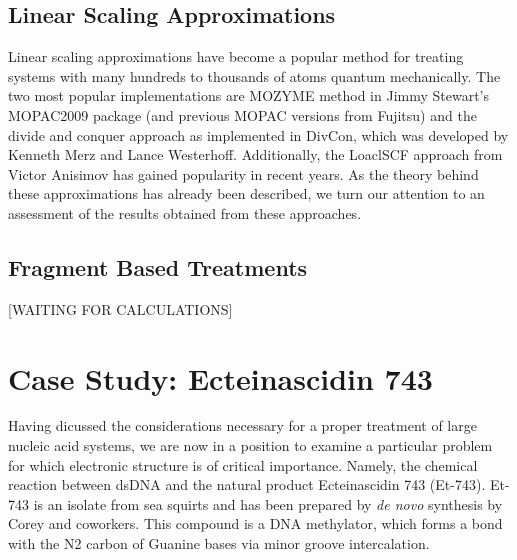 


\subsection{Linear Scaling Approximations}
Linear scaling approximations have become a popular method for
treating systems with many hundreds to thousands of atoms quantum
mechanically.  The two most popular implementations are MOZYME method
in Jimmy Stewart's MOPAC2009 package (and previous MOPAC versions from
Fujitsu) and the divide and conquer approach as implemented in DivCon,
which was developed by Kenneth Merz and Lance Westerhoff.
Additionally, the LoaclSCF approach from Victor Anisimov has gained
popularity in recent years.  As the theory behind these approximations
has already been described, we turn our attention to an assessment of
the results obtained from these approaches.




\subsection{Fragment Based Treatments}
[WAITING FOR CALCULATIONS]


\section{Case Study: Ecteinascidin 743}
Having dicussed the considerations necessary for a proper treatment of
large nucleic acid systems, we are now in a position to examine a
particular problem for which electronic structure is of critical
importance.  Namely, the chemical reaction between dsDNA and the
natural product Ecteinascidin 743 (Et-743).  Et-743 is an isolate from
sea squirts and has been prepared by \textit{de novo} synthesis by
Corey and coworkers.  This compound is a DNA methylator, which forms a
bond with the N2 carbon of Guanine bases via minor groove
intercalation.

